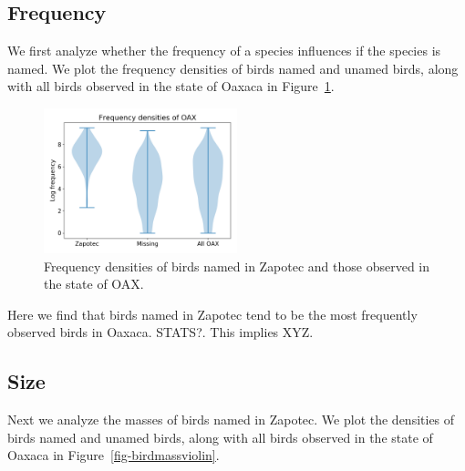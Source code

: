 \documentclass[10pt,letterpaper]{article}
\begin{document}
\subsection{Frequency}
We first analyze whether the frequency of a species influences if the species is named. We plot the frequency densities of birds named and unamed birds, along with all birds observed in the state of Oaxaca in Figure~\ref{fig-birdfreqviolin}.

\begin{figure}[h!]
  \begin{center}
    \includegraphics[width=0.5\textwidth]{./figures/birdfreq-violinplots.png}
        \caption{Frequency densities of birds named in Zapotec and those observed in the state of OAX.}
        \label{fig-birdfreqviolin}
  \end{center}
\end{figure}

Here we find that birds named in Zapotec tend to be the most frequently observed birds in Oaxaca. STATS?. This implies XYZ.

\subsection{Size}
Next we analyze the masses of birds named in Zapotec. We plot the densities of birds named and unamed birds, along with all birds observed in the state of Oaxaca in Figure~\ref{fig-birdmassviolin}.
\end{document}
